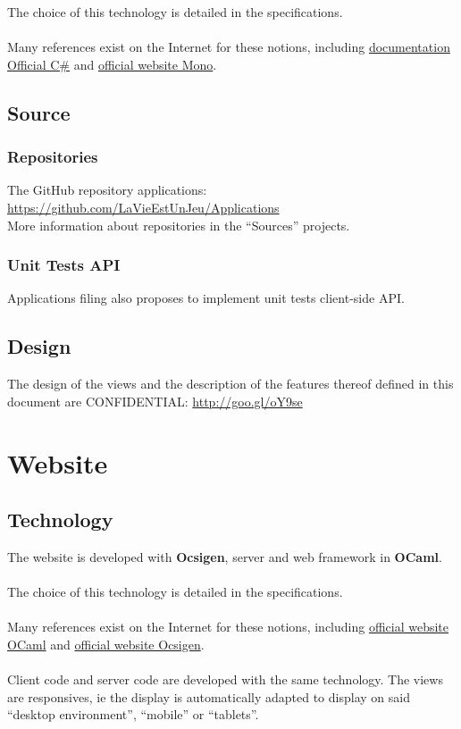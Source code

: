 \documentclass{life-fr}
\begin{document}
The choice of this technology is detailed in the specifications.\\
\\
Many references exist on the Internet for these notions, including
\href{http://msdn.microsoft.com/en-us/vstudio/hh341490.aspx}{documentation
Official C\#} and \href{http://www.mono-project.com/}{official website Mono}.

\section{Source}

\subsection{Repositories}

The GitHub repository applications:
\url{https://github.com/LaVieEstUnJeu/Applications} \\
More information about repositories in the ``Sources'' projects.

\subsection{Unit Tests API}

Applications filing also proposes to implement unit tests
client-side API.

\section{Design}

The design of the views and the description of the features thereof
defined in this document are CONFIDENTIAL:
\url{http://goo.gl/oY9se}


\chapter{Website}

\section{Technology}

The website is developed with \textbf{Ocsigen}, server and web framework
in \textbf{OCaml}.\\
\\
The choice of this technology is detailed in the specifications.\\
\\
Many references exist on the Internet for these notions, including
\href{http://ocaml.org/}{official website OCaml} and
\href{http://ocsigen.org/}{official website Ocsigen}.\\
\\
Client code and server code are developed
with the same technology. The views are responsives, ie
the display is automatically adapted to display on
said ``desktop environment'', ``mobile'' or ``tablets''.
\end{document}
